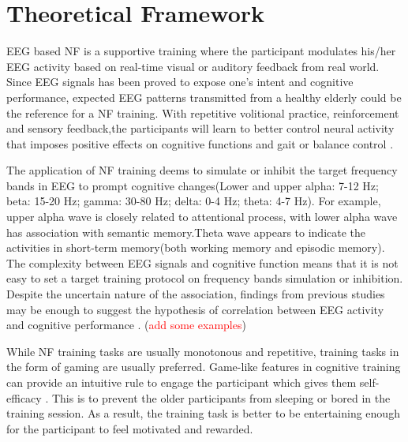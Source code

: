 \documentclass{article}
\begin{document}
\section{Theoretical Framework}
\begin{comment}
To describe the theoretical framework for the study.
•	A clear explanation of the proposed approach and why it is suitable to address the gaps outlined in the BACKGROUND section. 
•	Briefly outline a system of concepts, from published literature, that frames your study.
•	Can be presented either visually or textually. 
\end{comment}
EEG based NF is a supportive training where the participant modulates his/her EEG activity based on real-time visual or auditory feedback from real world. Since EEG signals has been proved to expose one's intent and cognitive performance, expected EEG patterns transmitted from a healthy elderly could be the reference for a NF training. With repetitive volitional practice, reinforcement and sensory feedback,the participants will learn to better control neural activity that imposes positive effects on cognitive functions and gait or balance control \cite{Miladinovic_2020}. 

The application of NF training deems to simulate or inhibit the target frequency bands in EEG to prompt cognitive changes(Lower and upper alpha: 7-12 Hz; beta: 15-20 Hz; gamma: 30-80 Hz; delta: 0-4 Hz; theta: 4-7 Hz). For example, upper alpha wave is closely related to attentional process, with lower alpha wave has association with semantic memory.Theta wave appears to indicate the activities in short-term memory(both working memory and episodic memory)\cite{Lecomte_2011}. The complexity between EEG signals and cognitive function means that it is not easy to set a target training protocol on frequency bands simulation or inhibition. Despite the uncertain nature of the association, findings from previous studies\cite{Asheri_2018, Doppelmayr_2011} may be enough to suggest the hypothesis of correlation between EEG activity and cognitive performance . (\textcolor{red}{add some examples})


While NF training tasks are usually monotonous and repetitive, training tasks in the form of gaming are usually preferred. Game-like features in cognitive training can provide an intuitive rule to engage the participant which gives them self-efficacy \cite{McGonigal_2011}. This is to prevent the older participants from sleeping or bored in the training session. As a result, the training task is better to be entertaining enough for the participant to feel motivated and rewarded. 
\end{document}
